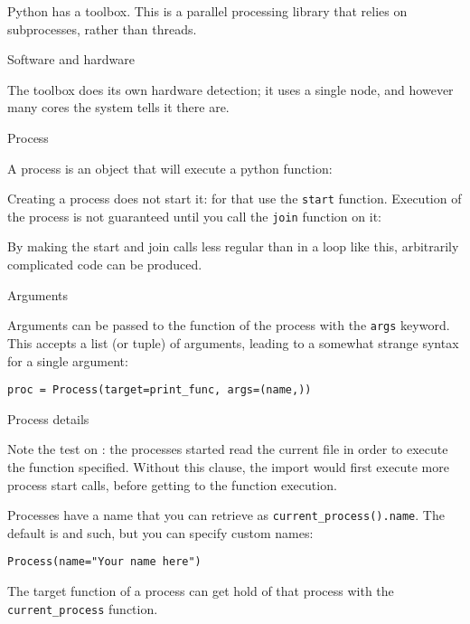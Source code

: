 
\lstset{language=Python}

Python has a  toolbox.
This is a parallel processing library that relies on subprocesses,
rather than threads.

 {Software and hardware}

The  toolbox does its own hardware detection;
it uses a single node, and however many cores the system tells it
there are.


 {Process}

A process is an object that will execute a python function:

Creating a process does not start it:
for that use the \lstinline{start} function.
Execution of the process is not guaranteed until you call the \lstinline{join}
function on it:

By making the start and join calls less regular than
in a loop like this,
arbitrarily complicated code can be produced.

 {Arguments}

Arguments can be passed to the function of the process
with the \lstinline{args} keyword.
This accepts a list (or tuple) of arguments,
leading to a somewhat strange syntax for a single argument:
\begin{lstlisting}
proc = Process(target=print_func, args=(name,))
\end{lstlisting}

 {Process details}

Note the test on :
the processes started read the current file in order to execute
the function specified.
Without this clause, the import would first execute more process start calls,
before getting to the function execution.

Processes have a name that you can retrieve as
\lstinline+current_process().name+.
The default is  and such,
but you can specify custom names:
\begin{lstlisting}
Process(name="Your name here")
\end{lstlisting}
The target function of a process can get hold of that process
with the  \lstinline+current_process+ function.

